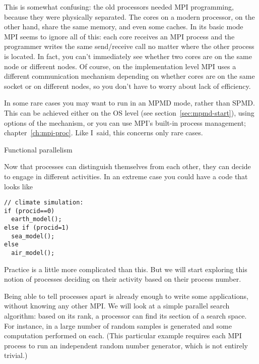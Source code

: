 This is somewhat confusing: the old processors needed MPI programming, because
they were physically separated. The cores on a modern processor, on the other hand,
share the same memory, and even some caches. In its basic mode MPI
seems to ignore all
of this: each core receives an MPI process and the programmer writes the same send/receive call no matter
where the other process is located. In fact, you can't immediately see
whether two cores are on the same node or different nodes. Of course,
on the implementation level MPI uses a different communication
mechanism depending on whether  cores are on the same socket or on
different nodes, so you don't have to worry about lack of efficiency.

\begin{remark}
  In some rare cases you may want to run in an \ac{MPMD} mode, rather
  than \ac{SPMD}. This can be achieved either on the \ac{OS} level
  (see section~\ref{sec:mpmd-start}),
  using options of the  mechanism, or you can use
  MPI's built-in process management; chapter~\ref{ch:mpi-proc}. Like
  I~said, this concerns only rare cases.
\end{remark}





 {Functional parallelism}

Now that processes can distinguish themselves from each other,
they can decide to engage in different activities.
In an extreme case you could have a code that looks like
\begin{lstlisting}
// climate simulation:
if (procid==0)
  earth_model();
else if (procid=1)
  sea_model();
else
  air_model();
\end{lstlisting}
Practice is a little more complicated than this. But we will start
exploring this notion of processes deciding on their activity
based on their process number.

Being able to tell processes apart is already enough to write some
applications, without knowing any other MPI.
We will look at a simple parallel search algorithm:
based on its rank, a processor can find its section of
a search space.  For instance, in  a
large number of random samples is generated and some computation
performed on each. (This particular example requires each MPI process
to run an independent random number generator, which is not entirely
trivial.)

